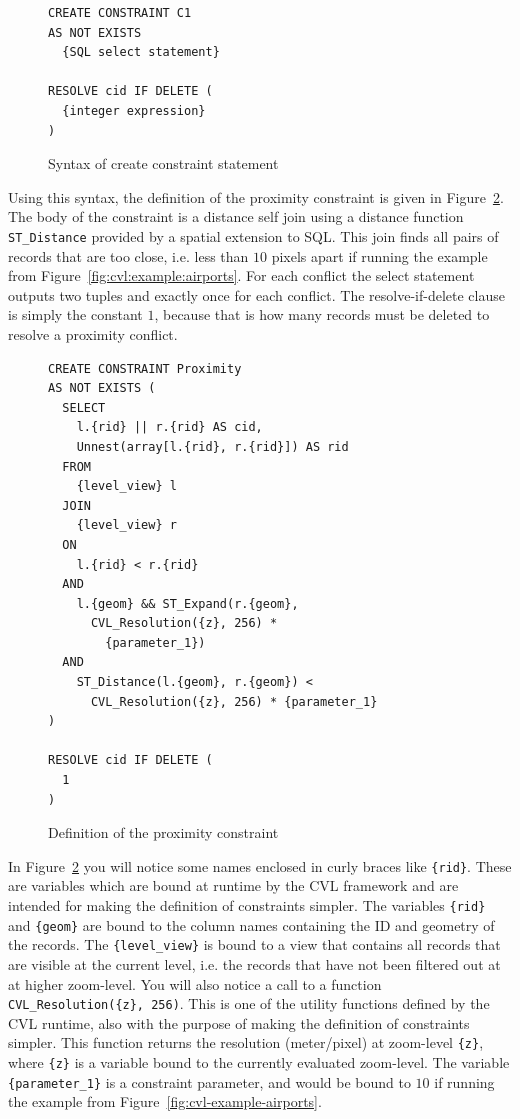 \begin{figure}[htbp]
\begin{center}
\begin{lstlisting}
CREATE CONSTRAINT C1
AS NOT EXISTS
  {SQL select statement}
  
RESOLVE cid IF DELETE (
  {integer expression}
)
\end{lstlisting}
\caption{Syntax of create constraint statement}
\label{fig:create:constraint:syntax}
\end{center}
\end{figure}

Using this syntax, the definition of the proximity constraint is given in Figure~\ref{fig:proximity:definition}. The body of the constraint is a distance self join using a distance function \texttt{ST\_Distance} provided by a spatial extension to SQL. This join finds all pairs of records that are too close, i.e. less than $10$ pixels apart if running the example from Figure~\ref{fig:cvl:example:airports}. For each conflict the select statement outputs two tuples and exactly once for each conflict. The resolve-if-delete clause is simply the constant $1$, because that is how many records must be deleted to resolve a proximity conflict.

\begin{figure}[htbp]
\begin{center}
\begin{lstlisting}
CREATE CONSTRAINT Proximity
AS NOT EXISTS (
  SELECT 
    l.{rid} || r.{rid} AS cid,
    Unnest(array[l.{rid}, r.{rid}]) AS rid
  FROM
    {level_view} l
  JOIN
    {level_view} r
  ON
    l.{rid} < r.{rid}
  AND
    l.{geom} && ST_Expand(r.{geom}, 
      CVL_Resolution({z}, 256) * 
        {parameter_1})
  AND
    ST_Distance(l.{geom}, r.{geom}) <
      CVL_Resolution({z}, 256) * {parameter_1}
)

RESOLVE cid IF DELETE (
  1
)
\end{lstlisting}
\caption{Definition of the proximity constraint}
\label{fig:proximity:definition}
\end{center}
\end{figure}

In Figure~\ref{fig:proximity:definition} you will notice some names enclosed in curly braces like \texttt{\{rid\}}. These are variables which are bound at runtime by the CVL framework and are intended for making the definition of constraints simpler. The variables \texttt{\{rid\}} and \texttt{\{geom\}} are bound to the column names containing the ID and geometry of the records. The \texttt{\{level\_view\}} is bound to a view that contains all records that are visible at the current level, i.e. the records that have not been filtered out at at higher zoom-level. You will also notice a call to a function \texttt{CVL\_Resolution(\{z\}, 256)}. This is one of the utility functions defined by the CVL runtime, also with the purpose of making the definition of constraints simpler. This function returns the resolution (meter/pixel) at zoom-level \texttt{\{z\}}, where \texttt{\{z\}} is a variable bound to the currently evaluated zoom-level. The variable \texttt{\{parameter\_1\}} is a constraint parameter, and would be bound to $10$ if running the example from Figure~\ref{fig:cvl-example-airports}.

